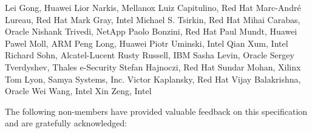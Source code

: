 Lei Gong,	Huawei	\newline
Lior Narkis,	Mellanox	\newline
Luiz Capitulino,	Red Hat	\newline
Marc-André Lureau, Red Hat	\newline
Mark Gray, Intel	\newline
Michael S. Tsirkin,	Red Hat	\newline
Mihai Carabas,	Oracle	\newline
Nishank Trivedi, NetApp	\newline
Paolo Bonzini,	Red Hat	\newline
Paul Mundt, Huawei	\newline
Pawel Moll,	ARM	\newline
Peng Long,	Huawei	\newline
Piotr Uminski, Intel	\newline
Qian Xum, Intel	\newline
Richard Sohn,	Alcatel-Lucent	\newline
Rusty Russell,	IBM	\newline
Sasha Levin,	Oracle	\newline
Sergey Tverdyshev,	Thales e-Security	\newline
Stefan Hajnoczi,	Red Hat	\newline
Sundar Mohan, Xilinx	\newline
Tom Lyon,	Samya Systems, Inc.	\newline
Victor Kaplansky, Red Hat	\newline
Vijay Balakrishna,	Oracle	\newline
Wei Wang, Intel	\newline
Xin Zeng, Intel	\newline

The following non-members have provided valuable feedback on this
specification and are gratefully acknowledged:

